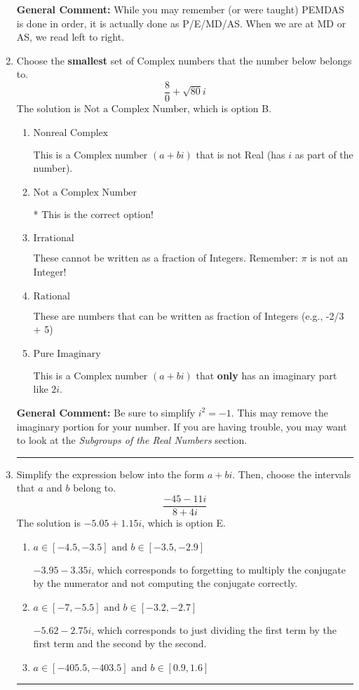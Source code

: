 \documentclass{extbook}[14pt]
\newcommand{\litem}[1]{\item #1

\rule{\textwidth}{0.4pt}}
\begin{document}
\begin{enumerate}
{\textbf{General Comment:} While you may remember (or were taught) PEMDAS is done in order, it is actually done as P/E/MD/AS. When we are at MD or AS, we read left to right.
}
\litem{
Choose the \textbf{smallest} set of Complex numbers that the number below belongs to.
\[ \frac{8}{0}+\sqrt{80} i \]The solution is \( \text{Not a Complex Number} \), which is option B.\begin{enumerate}[label=\Alph*.]
\item \( \text{Nonreal Complex} \)

This is a Complex number $(a+bi)$ that is not Real (has $i$ as part of the number).
\item \( \text{Not a Complex Number} \)

* This is the correct option!
\item \( \text{Irrational} \)

These cannot be written as a fraction of Integers. Remember: $\pi$ is not an Integer!
\item \( \text{Rational} \)

These are numbers that can be written as fraction of Integers (e.g., -2/3 + 5)
\item \( \text{Pure Imaginary} \)

This is a Complex number $(a+bi)$ that \textbf{only} has an imaginary part like $2i$.
\end{enumerate}

\textbf{General Comment:} Be sure to simplify $i^2 = -1$. This may remove the imaginary portion for your number. If you are having trouble, you may want to look at the \textit{Subgroups of the Real Numbers} section.
}
\litem{
Simplify the expression below into the form $a+bi$. Then, choose the intervals that $a$ and $b$ belong to.
\[ \frac{-45 - 11 i}{8 + 4 i} \]The solution is \( -5.05  + 1.15 i \), which is option E.\begin{enumerate}[label=\Alph*.]
\item \( a \in [-4.5, -3.5] \text{ and } b \in [-3.5, -2.9] \)

 $-3.95  - 3.35 i$, which corresponds to forgetting to multiply the conjugate by the numerator and not computing the conjugate correctly.
\item \( a \in [-7, -5.5] \text{ and } b \in [-3.2, -2.7] \)

 $-5.62  - 2.75 i$, which corresponds to just dividing the first term by the first term and the second by the second.
\item \( a \in [-405.5, -403.5] \text{ and } b \in [0.9, 1.6] \)


\end{enumerate}}
\end{enumerate}
\end{document}
